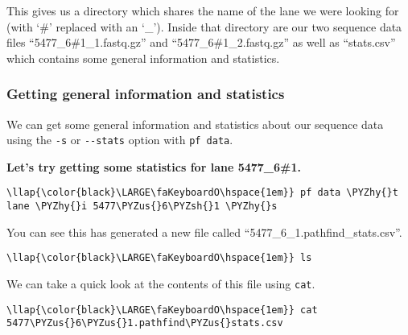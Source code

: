 \documentclass[11pt]{article}
\def\PYZus{\char`\_}
\def\PYZsh{\char`\#}
\def\PYZhy{\char`\-}
\begin{document}
    This gives us a directory which shares the name of the lane we were
looking for (with `\#' replaced with an `\_'). Inside that directory are
our two sequence data files ``5477\_6\#1\_1.fastq.gz'' and
``5477\_6\#1\_2.fastq.gz'' as well as ``stats.csv'' which contains some
general information and statistics.

    \hypertarget{getting-general-information-and-statistics}{%
\subsubsection{Getting general information and
statistics}\label{getting-general-information-and-statistics}}

    We can get some general information and statistics about our sequence
data using the \texttt{-s} or \texttt{-\/-stats} option with
\texttt{pf\ data}.

\textbf{Let's try getting some statistics for lane 5477\_6\#1.}

\begin{terminalinput}
\begin{Verbatim}[commandchars=\\\{\}]
\llap{\color{black}\LARGE\faKeyboardO\hspace{1em}} pf data \PYZhy{}t lane \PYZhy{}i 5477\PYZus{}6\PYZsh{}1 \PYZhy{}s
\end{Verbatim}
\end{terminalinput}

    You can see this has generated a new file called
``5477\_6\_1.pathfind\_stats.csv''.

\begin{terminalinput}
\begin{Verbatim}[commandchars=\\\{\}]
\llap{\color{black}\LARGE\faKeyboardO\hspace{1em}} ls
\end{Verbatim}
\end{terminalinput}

    We can take a quick look at the contents of this file using
\texttt{cat}.

\begin{terminalinput}
\begin{Verbatim}[commandchars=\\\{\}]
\llap{\color{black}\LARGE\faKeyboardO\hspace{1em}} cat 5477\PYZus{}6\PYZus{}1.pathfind\PYZus{}stats.csv
\end{Verbatim}
\end{terminalinput}
\end{document}
